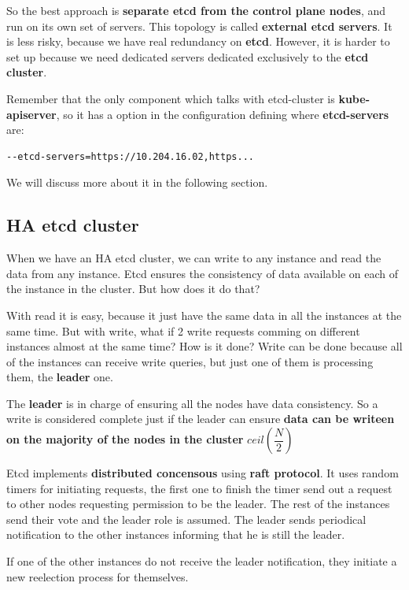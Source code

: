 \documentclass{article}
\newenvironment{codetemplate}[1][]{%
  \mybasecolorbox[#1]
  \itshape
}{%
  \endmybasecolorbox
}
\begin{document}
So the best approach is \textbf{separate etcd from the control plane nodes}, and run on its own set of servers. This topology is called \textbf{external etcd servers}. It is less risky, because we have real redundancy on \textbf{etcd}. However, it is harder to set up
because we need dedicated servers dedicated exclusively to the \textbf{etcd cluster}. 

Remember that the only component which talks with etcd-cluster is \textbf{kube-apiserver}, so it has a option in the configuration defining where \textbf{etcd-servers} are:
\begin{codetemplate}{}
\begin{verbatim}
--etcd-servers=https://10.204.16.02,https...
\end{verbatim}
\end{codetemplate}

We will discuss more about it in the following section.

\subsection{HA etcd cluster}
When we have an HA etcd cluster, we can write to any instance and read the data from any instance.
Etcd ensures the consistency of data available on each of the instance in the cluster. But how does it do that?

With read it is easy, because it just have the same data in all the instances at the same time. But with write, what if 2 write requests comming on different instances almost at the same time? How is it done?
Write can be done because all of the instances can receive write queries, but just one of them is processing them, the \textbf{leader} one.

The \textbf{leader} is in charge of ensuring all the nodes have data consistency. So a write is considered complete just if the leader can ensure \textbf{data can be writeen on the majority of the nodes in the cluster} $ceil(\dfrac{N}{2})$

Etcd implements \textbf{distributed concensous} using \textbf{raft protocol}. It uses random timers for initiating requests, the first one to finish the timer send out a request to other nodes requesting permission to be the leader.
The rest of the instances send their vote and the leader role is assumed. The leader sends periodical notification to the other instances informing that he is still the leader.

If one of the other instances do not receive the leader notification, they initiate a new reelection process for themselves.
\end{document}
